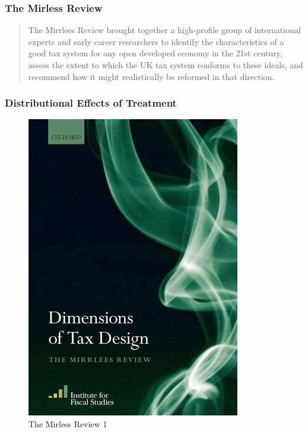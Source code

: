 \begin{frame}
\frametitle{The Mirless Review}

\begin{quote}
The Mirrlees Review brought together a high-profile group of
international experts and early career researchers to identify the
characteristics of a good tax system for any open developed economy in
the 21st century, assess the extent to which the UK tax system conforms
to these ideals, and recommend how it might realistically be reformed in
that direction.
\end{quote}
\end{frame}


\begin{frame}
\frametitle{Distributional Effects of Treatment}

\begin{figure}[htp]
\vspace*{-0.5cm}
\centering
\begin{minipage}[t]{0.4\textwidth}
  \centering
  \caption{The Mirless Review 1}\label{The Mirless Review 1}
  \includegraphics[width=\linewidth]{./material/fig-mirrlees-review-1.png}

\end{minipage}
\end{figure}
\end{frame}
